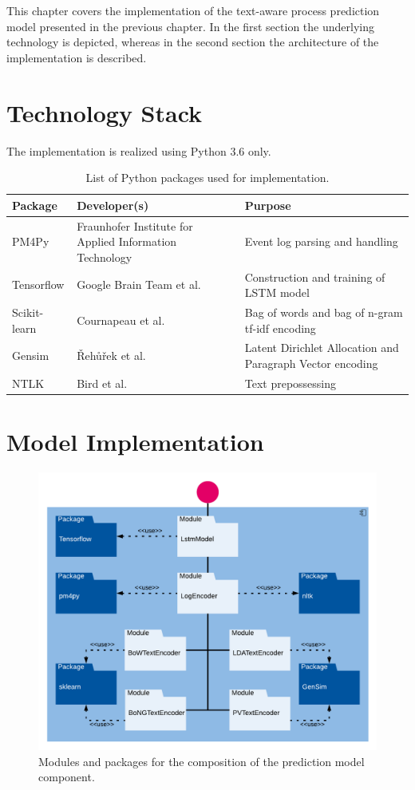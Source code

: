 This chapter covers the implementation of the text-aware process prediction model presented in the previous chapter.
In the first section the underlying technology is depicted, whereas in the second section the architecture of the implementation is described.

\section{Technology Stack}

The implementation is realized using Python 3.6 only.

\begin{table}[!htbp]
	\begin{tabularx}{\textwidth}{l p{4.5cm} p{6.6cm} }
		\toprule
		\textbf{Package} & \textbf{Developer(s)} & \textbf{Purpose}  \\
		\midrule
		PM4Py \cite{DBLP:journals/corr/abs-1905-06169}   &  Fraunhofer Institute for Applied Information Technology &  Event log parsing and handling\\
		Tensorflow \cite{DBLP:journals/corr/AbadiABBCCCDDDG16} &  Google Brain Team et al.& Construction and training of LSTM model \\
		Scikit-learn \cite{DBLP:journals/jmlr/PedregosaVGMTGBPWDVPCBPD11}& Cournapeau et al.& Bag of words and bag of n-gram tf-idf encoding \\
		Gensim \cite{rehurek_lrec} & Řehůřek et al. & Latent Dirichlet Allocation and Paragraph Vector encoding \\
		NTLK \cite{DBLP:books/daglib/0022921} & Bird et al. & Text prepossessing\\
		 \bottomrule
	\end{tabularx}
	\caption[List of Python packages used for implementation]{List of Python packages used for implementation.}
	\label{tab:packages}
\end{table}

\section{Model Implementation}

\begin{figure}[htbp!]
	\centering
	\includegraphics[width=\textwidth]{figures/implementation}
	\caption[Composition of the prediction model]{Modules and packages for the composition of the prediction model component.}
	\label{fig:/implementation}
\end{figure}